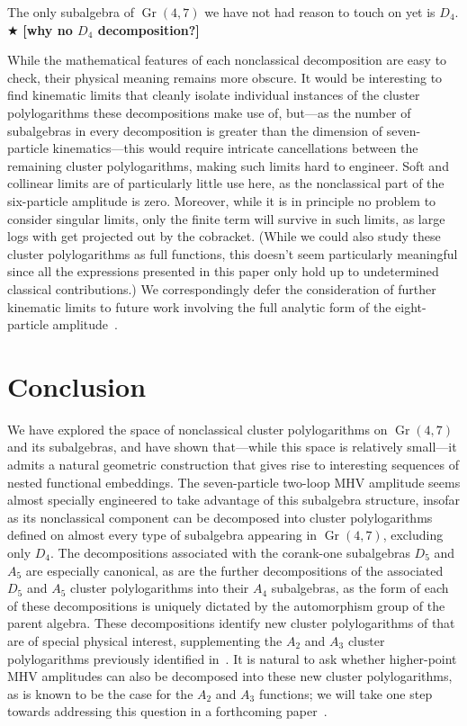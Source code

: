 \documentclass[12pt]{article}
\DeclareMathOperator{\Gr}{Gr}
\def\draftnote#1{{\color{red} $\bigstar$ }{\bf [#1]}}
\begin{document}
The only subalgebra of $\Gr(4,7)$ we have not had reason to touch on yet is $D_4$. \draftnote{why no $D_4$ decomposition?}

While the mathematical features of each nonclassical decomposition are easy to check, their physical meaning remains more obscure. It would be interesting to find kinematic limits that cleanly isolate individual instances of the cluster polylogarithms these decompositions make use of, but---as the number of subalgebras in every decomposition is greater than the dimension of seven-particle kinematics---this would require intricate cancellations between the remaining cluster polylogarithms, making such limits hard to engineer. Soft and collinear limits are of particularly little use here, as the nonclassical part of the six-particle amplitude is zero. Moreover, while it is in principle no problem to consider singular limits, only the finite term will survive in such limits, as large logs with get projected out by the cobracket. (While we could also study these cluster polylogarithms as full functions, this doesn't seem particularly meaningful since all the expressions presented in this paper only hold up to undetermined classical contributions.)  We correspondingly defer the consideration of further kinematic limits to future work involving the full analytic form of the eight-particle amplitude~\cite{cluster_subalgebras_ii}.


\section{Conclusion}

We have explored the space of nonclassical cluster polylogarithms on $\Gr(4,7)$ and its subalgebras, and have shown that---while this space is relatively small---it admits a natural geometric construction that gives rise to interesting sequences of nested functional embeddings. The seven-particle two-loop MHV amplitude seems almost specially engineered to take advantage of this subalgebra structure, insofar as its nonclassical component can be decomposed into cluster polylogarithms defined on almost every type of subalgebra appearing in $\Gr(4,7)$, excluding only $D_4$. The decompositions associated with the corank-one subalgebras $D_5$ and $A_5$ are especially canonical, as are the further decompositions of the associated $D_5$ and $A_5$ cluster polylogarithms into their $A_4$ subalgebras, as the form of each of these decompositions is uniquely dictated by the automorphism group of the parent algebra. These decompositions identify new cluster polylogarithms of that are of special physical interest, supplementing the $A_2$ and $A_3$ cluster polylogarithms previously identified in~\cite{Golden:2014xqa}. It is natural to ask whether higher-point MHV amplitudes can also be decomposed into these new cluster polylogarithms, as is known to be the case for the $A_2$ and $A_3$ functions; we will take one step towards addressing this question in a forthcoming paper~\cite{cluster_subalgebras_ii}.
\end{document}
